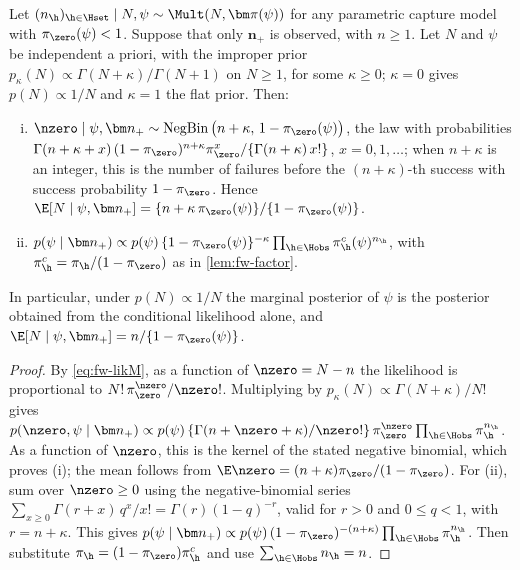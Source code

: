 \begin{lemma}\label{lem:models-negbin}
Let $(n_{\h})_{\h\in\Hset}\mid N,\psi\sim\Mult(N,\bm\pi(\psi))$ for any parametric capture model with $\pi_{\zero}(\psi)<1$. Suppose that only $\bm n_+$ is observed, with $n\ge1$. Let $N$ and $\psi$ be independent a priori, with the improper prior $p_\kappa(N)\propto\Gamma(N+\kappa)/\Gamma(N+1)$ on $N\ge1$, for some $\kappa\ge0$; $\kappa=0$ gives $p(N)\propto1/N$ and $\kappa=1$ the flat prior. Then:
\begin{enumerate}[(i)]
  \item $\nzero\mid\psi,\bm n_+\sim\operatorname{NegBin}\big(n+\kappa,\,1-\pi_{\zero}(\psi)\big)$, the law with probabilities $\Gamma(n+\kappa+x)\,(1-\pi_{\zero})^{n+\kappa}\pi_{\zero}^{x}/\{\Gamma(n+\kappa)\,x!\}$, $x=0,1,\dots$; when $n+\kappa$ is an integer, this is the number of failures before the $(n+\kappa)$-th success with success probability $1-\pi_{\zero}$. Hence
  $\E[N\mid\psi,\bm n_+]=\{n+\kappa\,\pi_{\zero}(\psi)\}/\{1-\pi_{\zero}(\psi)\}$.
  \item $p(\psi\mid\bm n_+)\propto p(\psi)\,\{1-\pi_{\zero}(\psi)\}^{-\kappa}\prod_{\h\in\Hobs}\pi^c_{\h}(\psi)^{n_{\h}}$, with $\pi^c_{\h}=\pi_{\h}/(1-\pi_{\zero})$ as in \cref{lem:fw-factor}.
\end{enumerate}
In particular, under $p(N)\propto1/N$ the marginal posterior of $\psi$ is the posterior obtained from the conditional likelihood alone, and $\E[N\mid\psi,\bm n_+]=n/\{1-\pi_{\zero}(\psi)\}$.
\end{lemma}

\begin{proof}
By \eqref{eq:fw-likM}, as a function of $\nzero=N-n$ the likelihood is proportional to $N!\,\pi_{\zero}^{\nzero}/\nzero!$. Multiplying by $p_\kappa(N)\propto\Gamma(N+\kappa)/N!$ gives
$p(\nzero,\psi\mid\bm n_+)\propto p(\psi)\,\{\Gamma(n+\nzero+\kappa)/\nzero!\}\,\pi_{\zero}^{\nzero}\prod_{\h\in\Hobs}\pi_{\h}^{n_{\h}}$.
As a function of $\nzero$, this is the kernel of the stated negative binomial, which proves (i); the mean follows from $\E\nzero=(n+\kappa)\pi_{\zero}/(1-\pi_{\zero})$. For (ii), sum over $\nzero\ge0$ using the negative-binomial series $\sum_{x\ge0}\Gamma(r+x)\,q^{x}/x!=\Gamma(r)(1-q)^{-r}$, valid for $r>0$ and $0\le q<1$, with $r=n+\kappa$. This gives $p(\psi\mid\bm n_+)\propto p(\psi)\,(1-\pi_{\zero})^{-(n+\kappa)}\prod_{\h\in\Hobs}\pi_{\h}^{n_{\h}}$. Then substitute $\pi_{\h}=(1-\pi_{\zero})\pi^c_{\h}$ and use $\sum_{\h\in\Hobs}n_{\h}=n$.
\end{proof}

